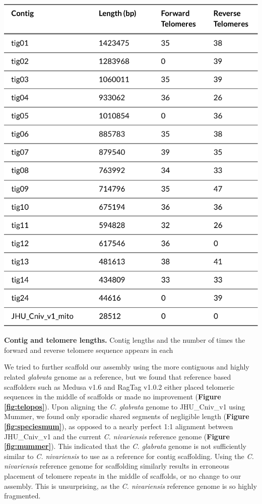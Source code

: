 \begin{table}[!ht]
\centering
\includegraphics[width = .75\linewidth,keepaspectratio]{figure/telotable.pdf}
\caption[Contig and telomere lengths]{{\bf Contig and telomere lengths.} Contig lengths and the number of times the forward and reverse telomere sequence appears in each }
\label{tab:telotable}
\end{table}


We tried to further scaffold our assembly using the more contiguous and highly related \textit{glabrata} genome as a reference, but we found that reference based scaffolders such as Medusa v1.6 \citep{Bosi2015-rm} and RagTag v1.0.2 \citep{Alonge2019-re} either placed telomeric sequences in the middle of scaffolds or made no improvement ({\bf Figure \ref{fig:telopos}}). Upon aligning the \textit{C. glabrata} genome to JHU\_Cniv\_v1 using Mummer, we found only sporadic shared segments of negligible length ({\bf Figure \ref{fig:speciesmum}}), as opposed to a nearly perfect 1:1 alignment between JHU\_Cniv\_v1 and the current \textit{C. nivariensis} reference genome ({\bf Figure \ref{fig:mummer}}). This indicated that the \textit{C. glabrata} genome is not sufficiently similar to \textit{C. nivariensis} to use as a reference for contig scaffolding. Using the \textit{C. nivariensis} reference genome for scaffolding similarly results in erroneous placement of telomere repeats in the middle of scaffolds, or no change to our assembly. This is unsurprising, as the \textit{C. nivariensis} reference genome is so highly fragmented.


